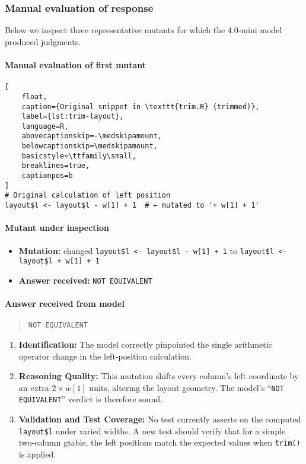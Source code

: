 \subsubsection{Manual evaluation of response}

Below we inspect three representative mutants for which the 4.0‐mini model produced judgments.

\paragraph{Manual evaluation of first mutant}
\begin{lstlisting}[
    float,
    caption={Original snippet in \texttt{trim.R} (trimmed)},
    label={lst:trim-layout},
    language=R,
    abovecaptionskip=-\medskipamount,
    belowcaptionskip=\medskipamount,
    basicstyle=\ttfamily\small,
    breaklines=true,
    captionpos=b
]
# Original calculation of left position
layout$l <- layout$l - w[1] + 1  # ← mutated to '+ w[1] + 1'
\end{lstlisting}

\paragraph{Mutant under inspection}
\begin{itemize}
  \item \textbf{Mutation:} changed  
    \texttt{layout\$l <- layout\$l - w[1] + 1}  
    to  
    \texttt{layout\$l <- layout\$l + w[1] + 1}
  \item \textbf{Answer received:} \texttt{NOT EQUIVALENT}
\end{itemize}

\paragraph{Answer received from model}
\begin{quote}
\texttt{NOT EQUIVALENT}
\end{quote}

\begin{enumerate}
  \item \textbf{Identification:}  
    The model correctly pinpointed the single arithmetic operator change in the left‐position calculation.

  \item \textbf{Reasoning Quality:}  
    This mutation shifts every column’s left coordinate by an extra \(2\times w[1]\) units, altering the layout geometry. The model’s “\texttt{NOT EQUIVALENT}” verdict is therefore sound.

  \item \textbf{Validation and Test Coverage:}  
    No test currently asserts on the computed \texttt{layout\$l} under varied widths. A new test should verify that for a simple two‐column gtable, the left positions match the expected values when \texttt{trim()} is applied.
\end{enumerate}

